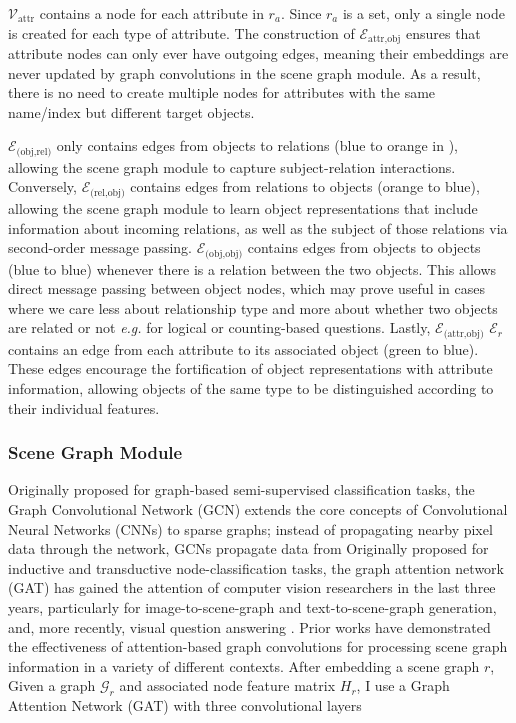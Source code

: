 \(\mathcal{V}_\text{attr}\) contains a node for each attribute in \(r_a\). Since \(r_a\) is a set, only a single node is created for each type of attribute. The construction of \(\mathcal{E}_\text{attr,obj}\) ensures that attribute nodes can only ever have outgoing edges, meaning their embeddings are never updated by graph convolutions in the scene graph module. As a result, there is no need to create multiple nodes for attributes with the same name/index but different target objects.

\(\mathcal{E}_{\text{(obj,rel)}}\) only contains edges from objects to relations (blue to orange in \figureautorefname{ \ref{fig:scene_graph_construction}}), allowing the scene graph module to capture subject-relation interactions. Conversely, \(\mathcal{E}_{\text{(rel,obj)}}\) contains edges from relations to objects (orange to blue), allowing the scene graph module to learn object representations that include information about incoming relations, as well as the subject of those relations via second-order message passing. \(\mathcal{E}_{\text{(obj,obj)}}\) contains edges from objects to objects (blue to blue) whenever there is a relation between the two objects. This allows direct message passing between object nodes, which may prove useful in cases where we care less about relationship type and more about whether two objects are related or not \textit{e.g.} for logical or counting-based questions. Lastly, \(\mathcal{E}_{\text{(attr,obj)}}\) \(\mathcal{E}_r\) contains an edge from each attribute to its associated object (green to blue). These edges encourage the fortification of object representations with attribute information, allowing objects of the same type to be distinguished according to their individual features.

\subsubsection{Scene Graph Module}
Originally proposed for graph-based semi-supervised classification tasks, the Graph Convolutional Network (GCN) extends the core concepts of Convolutional Neural Networks (CNNs) to sparse graphs; instead of propagating nearby pixel data through the network, GCNs propagate data from 
Originally proposed for inductive and transductive node-classification tasks, the graph attention network (GAT) \cite{velivckovic2017graph} has gained the attention of computer vision researchers in the last three years, particularly for image-to-scene-graph \cite{yang2018graph} and text-to-scene-graph \cite{han2020victr} generation, and, more recently, visual question answering \cite{li2019relation, huang2020aligned}.
Prior works have demonstrated the effectiveness of attention-based graph convolutions for processing scene graph information in a variety of different contexts. \citeauthor{yang2018graph}
After embedding a scene graph \(r\), Given a graph \(\mathcal{G}_r\) and associated node feature matrix \(H_r\), I use a Graph Attention Network (GAT) with three convolutional layers

